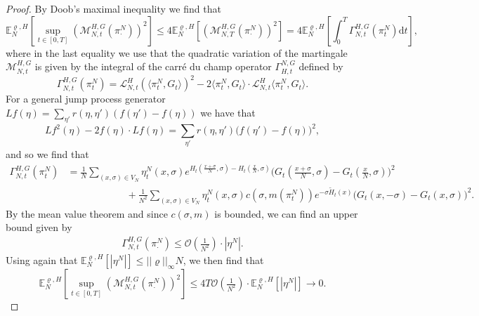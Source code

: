 \documentclass[11pt]{article}
\numberwithin{equation}{section}
\theoremstyle{definition}
\theoremstyle{plain}
\newcommand{\E}{\mathbb{E}}
\newcommand{\dd}{\mathrm{d}}
\newcommand{\nn}{\nonumber}
\begin{document}
\begin{proof}
By Doob's maximal inequality we find that 
    \begin{equation}
        \E^{\varrho,H}_N\left[\sup_{t\in[0,T]} \left(\mathscr{M}_{N,t}^{H,G}(\pi^N_{\cdot})\right)^2\right] \leq 4 \E^{\varrho,H}_N\left[ \left(\mathscr{M}_{N,T}^{H,G}(\pi^N_{\cdot})\right)^2\right] = 4\E^{\varrho,H}_N\left[ \int_0^T \Gamma_{N,t}^{H,G}(\pi^N_{t})\dd t\right],
    \end{equation}
where in the last equality we use that the quadratic variation of the martingale $\mathscr{M}_{N,t}^{H,G}$ is given by the integral of the  carr\'e du champ operator $\Gamma_{H,t}^{N,G}$ defined by
    \begin{equation}\label{cdc}
        \Gamma_{N,t}^{H,G}(\pi^N_{t}) = \mathscr{L}^H_{N,t} (\langle \pi^N_{t}, G_t \rangle )^2 - 2\langle \pi^N_{t}, G_t \rangle \cdot \mathscr{L}^H_{N,t} \langle \pi^N_{t}, G_t \rangle .
    \end{equation}
 For a general jump process generator $Lf(\eta) = \sum_{\eta'} r(\eta,\eta') (f(\eta') - f(\eta))$ we have that 
    \begin{equation}
        Lf^2(\eta) - 2 f(\eta)\cdot Lf(\eta) = \sum_{\eta'} r(\eta,\eta') \big(f(\eta') - f(\eta)\big)^2,
    \end{equation}
and so we find that 
    \begin{align}
        \nn\Gamma_{N,t}^{H,G}(\pi^N_t) &= \frac{1}{N} \sum_{(x,\sigma) \in V_N} \eta^N_t(x,\sigma)e^{H_t(\frac{x+\sigma}{N},\sigma) - H_t(\frac{x}{N},\sigma)} \big(G_t(\tfrac{x+\sigma}{N},\sigma) - G_t(\tfrac{x}{N},\sigma)\big)^2 \\
        &\qquad \qquad \qquad +\frac{1}{N^2} \sum_{(x,\sigma) \in V_N} \eta^N_t(x,\sigma)c(\sigma,m(\pi^N_t)) e^{-\sigma \widetilde{H}_t(x)}\big(G_t(x,-\sigma)- G_t(x,\sigma)\big)^2.
    \end{align}
By the mean value theorem and since $c(\sigma,m)$ is bounded, we can find an upper bound given by
    \begin{align}
        \Gamma_{N,t}^{H,G}(\pi^N_{\cdot}) \leq \mathcal{O}(\tfrac{1}{N^2})\cdot |\eta^N|.
    \end{align}
Using again that $\E^{\varrho,H}_N\left[|\eta^N|\right] \leq ||\varrho||_\infty N$, we then find that 
    \begin{equation}
        \E^{\varrho,H}_N\left[\sup_{t\in[0,T]} \left(\mathscr{M}_{N,t}^{H,G}(\pi^N_{\cdot})\right)^2\right] \leq 4 T \mathcal{O}(\tfrac{1}{N^2})\cdot\E^{\varrho,H}_N\left[|\eta^N|\right] \to 0.
    \end{equation}
\end{proof}
\end{document}
